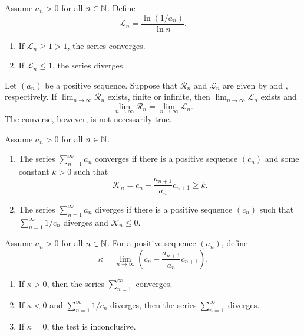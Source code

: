 \begin{proposition}
  Assume $a_n > 0$ for all $n \in \mathbb N$. Define
  \[ \mathcal{L}_n = \frac{\ln(1/a_n)}{\ln n}. \]
  \begin{enumerate}
    \item If $\mathcal{L}_n \geq 1 > 1$, the series converges.
    \item If $\mathcal{L}_n \leq 1$, the series diverges.
  \end{enumerate}
\end{proposition}

\begin{proposition}
  Let $(a_n)$ be a positive sequence. Suppose that $\mathcal{R}_n$
  and $\mathcal{L}_n$ are given by  and
  , respectively. If $\lim_{n \to \infty}
  \mathcal{R}_n$ exists, finite or infinite, then $\lim_{n \to
  \infty} \mathcal{L}_n$ exists and
  \[ \lim_{n \to \infty} \mathcal{R}_n = \lim_{n \to \infty} \mathcal{L}_n. \]
  The converse, however, is not necessarily true.
\end{proposition}

\begin{proposition}
  Assume $a_n > 0$ for all $n \in \mathbb N$.
  \begin{enumerate}
    \item The series $\sum_{n = 1}^{\infty} a_n$ converges if there
      is a positive sequence $(c_n)$ and some constant $k > 0$ such that
      \[ \mathcal{K}_n = c_n - \frac{a_{n + 1}}{a_n} c_{n + 1} \geq k. \]
    \item The series $\sum_{n = 1}^{\infty} a_n$ diverges if there is
      a positive sequence $(c_n)$ such that $\sum_{n = 1}^{\infty} 1/c_n$
      diverges and $\mathcal{K}_n \leq 0$.
  \end{enumerate}
\end{proposition}

\begin{proposition}
  Assume $a_n > 0$ for all $n \in \mathbb N$. For a positive sequence $(a_n)$, define
  \[ \kappa = \lim_{n \to \infty} \left(c_n - \frac{a_{n + 1}}{a_n}
  c_{n + 1}\right). \]
  \begin{enumerate}
    \item If $\kappa > 0$, then the series $\sum_{n = 1}^{\infty}$ converges.
    \item If $\kappa < 0$ and $\sum_{n = 1}^{\infty} 1/c_n$ diverges,
      then the series $\sum_{n = 1}^{\infty}$ diverges.
    \item If $\kappa = 0$, the test is inconclusive.
  \end{enumerate}
\end{proposition}

